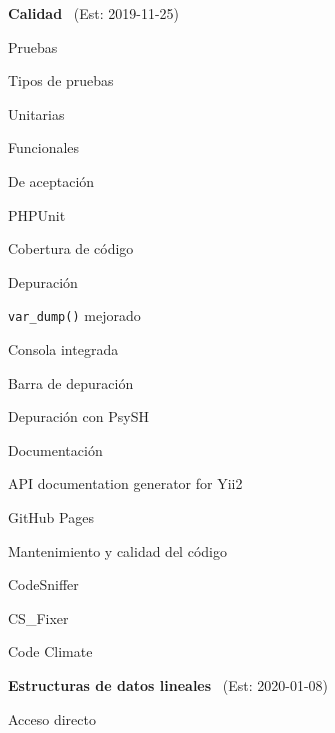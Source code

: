 \begin{longenum}
    \item \textbf{Calidad} \ (Est: 2019-11-25)
    \begin{longenum}
        \item Pruebas
        \begin{longenum}
            \item Tipos de pruebas
            \begin{longenum}
                \item Unitarias
                \item Funcionales
                \item De aceptación
            \end{longenum}
            \item PHPUnit
            \item Cobertura de código \opcional\
        \end{longenum}
        \item Depuración
        \begin{longenum}
            \item \texttt{var\_dump()} mejorado
            \item Consola integrada
            \item Barra de depuración
            \item Depuración con PsySH \opcional\
        \end{longenum}
        \item Documentación
        \begin{longenum}
            \item API documentation generator for Yii2
            \item GitHub Pages
        \end{longenum}
        \item Mantenimiento y calidad del código
        \begin{longenum}
            \item CodeSniffer
            \item CS\_Fixer
            \item Code Climate
        \end{longenum}
    \end{longenum}
    \item \textbf{Estructuras de datos lineales} \ (Est: 2020-01-08)
    \begin{longenum}
        \item Acceso directo
        \begin{longenum}

\end{longenum}
\end{longenum}
\end{longenum}
